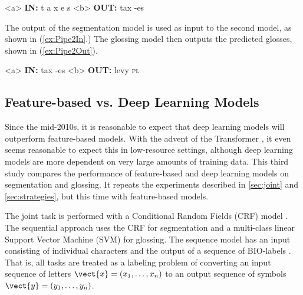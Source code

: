 \pex  
\label{ex:Pipe1InOut}
\a<a> \textbf{IN:} \hspace{6 mm} t \hspace{2 mm} a \hspace{2 mm} x \hspace{2 mm} e \hspace{2 mm} s 
\label{ex:Pipe1in}
\a<b> \textbf{OUT:} \hspace{2 mm} tax \hspace{3 mm} -es
\label{ex:Pipe1Out}
\xe

The output of the segmentation model is used as input to the second model, as shown in (\ref{ex:Pipe2In}.) The glossing model then outputs the predicted glosses, shown in (\ref{ex:Pipe2Out}). 

\pex  
\label{ex:Pipe2InOut}
\a<a> \textbf{IN:} \hspace{6 mm} tax \hspace{3 mm} -es
\label{ex:Pipe2In}
\a<b> \textbf{OUT:} \hspace{2 mm} levy \hspace{2 mm} \textsc{pl}
\label{ex:Pipe2Out}
\xe

\subsection{Feature-based vs. Deep Learning Models}
\label{sec:CRFvNN}

Since the mid-2010s, it is reasonable to expect that deep learning models will outperform feature-based models. With the advent of the Transformer \citep{vaswani_attention_2017}, it even seems reasonable to expect this in low-resource settings, although deep learning models are more dependent on very large amounts of training data. This third study compares the performance of feature-based and deep learning models on segmentation and glossing. It repeats the experiments described in \autoref{sec:joint} and \autoref{sec:strategies}, but this time with feature-based models.

The joint task is performed with a Conditional Random Fields (CRF) model \citep{lafferty_conditional_2001}. The sequential approach uses the CRF for segmentation and a multi-class linear Support Vector Machine (SVM) for glossing.
The sequence model has an input consisting of individual characters and the output of a sequence of BIO-labels \citep{ramshaw1999}. That is, all tasks are treated as a labeling problem of converting an input sequence of letters $\vect{x} = (x_1, \ldots, x_n)$ to an output sequence of symbols $\vect{y} = (y_1, \ldots, y_n)$.  

